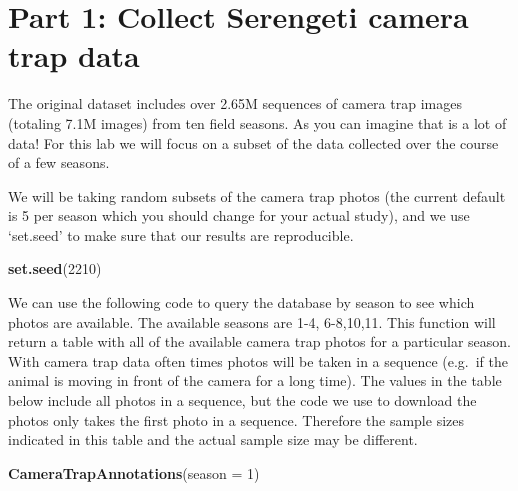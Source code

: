 \documentclass[]{book}
\newenvironment{Shaded}{\begin{snugshade}}{\end{snugshade}}
\newcommand{\DataTypeTok}[1]{\textcolor[rgb]{0.13,0.29,0.53}{#1}}
\newcommand{\DecValTok}[1]{\textcolor[rgb]{0.00,0.00,0.81}{#1}}
\newcommand{\KeywordTok}[1]{\textcolor[rgb]{0.13,0.29,0.53}{\textbf{#1}}}
\newcommand{\NormalTok}[1]{#1}
\begin{document}
\hypertarget{part-1-collect-serengeti-camera-trap-data}{%
\section*{Part 1: Collect Serengeti camera trap data}\label{part-1-collect-serengeti-camera-trap-data}}

The original dataset includes over 2.65M sequences of camera trap images (totaling 7.1M images) from ten field seasons. As you can imagine that is a lot of data! For this lab we will focus on a subset of the data collected over the course of a few seasons.

We will be taking random subsets of the camera trap photos (the current default is 5 per season which you should change for your actual study), and we use `set.seed' to make sure that our results are reproducible.

\begin{Shaded}
\begin{Highlighting}[]
\KeywordTok{set.seed}\NormalTok{(}\DecValTok{2210}\NormalTok{)}
\end{Highlighting}
\end{Shaded}

We can use the following code to query the database by season to see which photos are available. The available seasons are 1-4, 6-8,10,11. This function will return a table with all of the available camera trap photos for a particular season. With camera trap data often times photos will be taken in a sequence (e.g.~if the animal is moving in front of the camera for a long time). The values in the table below include all photos in a sequence, but the code we use to download the photos only takes the first photo in a sequence. Therefore the sample sizes indicated in this table and the actual sample size may be different.

\begin{Shaded}
\begin{Highlighting}[]
\KeywordTok{CameraTrapAnnotations}\NormalTok{(}\DataTypeTok{season =} \DecValTok{1}\NormalTok{)}
\end{Highlighting}
\end{Shaded}
\end{document}
